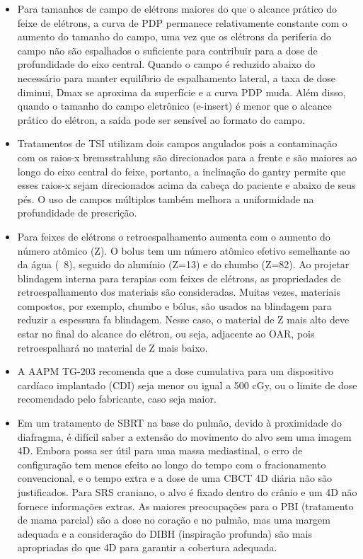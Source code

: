 \documentclass[11pt,a4paper]{article}
\newcounter{exemplo}
\begin{document}
\begin{exemplo}[Radioterapia]
\begin{itemize}
        \item Para tamanhos de campo de elétrons maiores do que o alcance prático do feixe de elétrons, a curva de PDP permanece relativamente constante com o aumento do tamanho do campo, uma vez que os elétrons da periferia do campo não são espalhados o suficiente para contribuir para a dose de profundidade do eixo central. Quando o campo é reduzido abaixo do necessário para manter equilíbrio de espalhamento lateral, a taxa de dose diminui, Dmax se aproxima da superfície e a curva PDP muda. Além disso, quando o tamanho do campo eletrônico (e-insert) é menor que o alcance prático do elétron, a saída pode ser sensível ao formato do campo.
        
        \item Tratamentos de TSI utilizam dois campos angulados pois a contaminação com os raios-x  bremsstrahlung são direcionados para a frente e são maiores ao longo do eixo central do feixe, portanto, a inclinação do gantry permite que esses raios-x sejam direcionados acima da cabeça do paciente e abaixo de seus pés. O uso de campos múltiplos também melhora a uniformidade na profundidade de prescrição.
        
        \item Para feixes de elétrons o retroespalhamento aumenta com o aumento do número atômico (Z). O bolus tem um número atômico efetivo semelhante ao da água (~8), seguido do alumínio (Z=13) e do chumbo (Z=82). Ao projetar blindagem interna para terapias com feixes de elétrons, as propriedades de retroespalhamento dos materiais são consideradas. Muitas vezes, materiais compostos, por exemplo, chumbo e bólus, são usados na blindagem para reduzir a espessura fa blindagem. Nesse caso, o material de Z mais alto deve estar no final do alcance do elétron, ou seja, adjacente ao OAR, pois retroespalhará no material de Z mais baixo.
        
        \item A AAPM TG-203 recomenda que a dose cumulativa para um dispositivo cardíaco implantado (CDI) seja menor ou igual a 500 cGy, ou o limite de dose recomendado pelo fabricante, caso seja maior.
        
        
        \item Em um tratamento de SBRT na base do pulmão, devido à proximidade do diafragma, é difícil saber a extensão do movimento do alvo sem uma imagem 4D. Embora possa ser útil para uma massa mediastinal, o erro de configuração tem menos efeito ao longo do tempo com o fracionamento convencional, e o tempo extra e a dose de uma CBCT 4D diária não são justificados. Para SRS craniano, o alvo é fixado dentro do crânio e um 4D não fornece informações extras. As maiores preocupações para o PBI (tratamento de mama parcial) são a dose no coração e no pulmão, mas uma margem adequada e a consideração do DIBH (inspiração profunda) são mais apropriadas do que 4D para garantir a cobertura adequada.
        

\end{itemize}
\end{exemplo}
\end{document}
